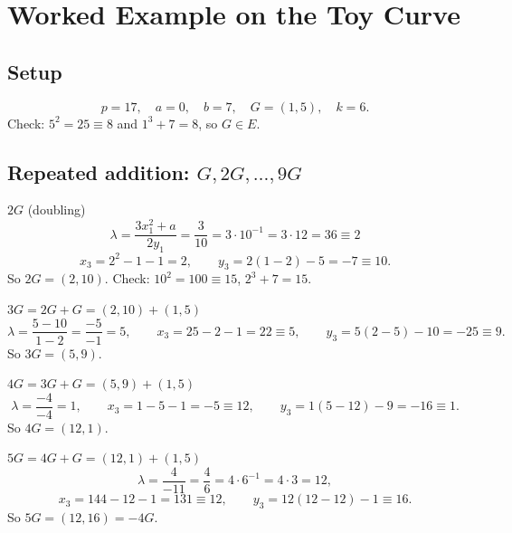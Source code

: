 \chapter{Worked Example on the Toy Curve}
\label{ch:worked}


\section{Setup}

\[
  p = 17, \quad a = 0, \quad b = 7, \quad G = (1, 5), \quad k = 6 .
\]
Check: $5^2 = 25 \equiv 8$ and $1^3 + 7 = 8$, so $G \in E$. \checkmark

\section{Repeated addition: $G, 2G, \ldots, 9G$}

\begin{framedex}[label={ex:2G}]{$2G$ (doubling)}
  \[
    \lambda = \frac{3 x_1^2 + a}{2 y_1} = \frac{3}{10} = 3 \cdot 10^{-1} = 3 \cdot 12 = 36 \equiv 2
  \]
  \[
    x_3 = 2^2 - 1 - 1 = 2, \qquad y_3 = 2(1 - 2) - 5 = -7 \equiv 10 .
  \]
  So $2G = (2, 10)$. Check: $10^2 = 100 \equiv 15$, $2^3 + 7 = 15$. \checkmark
\end{framedex}

\begin{framedex}{$3G = 2G + G = (2,10) + (1,5)$}
  \[
    \lambda = \frac{5 - 10}{1 - 2} = \frac{-5}{-1} = 5, \qquad
    x_3 = 25 - 2 - 1 = 22 \equiv 5, \qquad
    y_3 = 5(2 - 5) - 10 = -25 \equiv 9 .
  \]
  So $3G = (5, 9)$.
\end{framedex}

\begin{framedex}{$4G = 3G + G = (5,9) + (1,5)$}
  \[
    \lambda = \frac{-4}{-4} = 1, \qquad
    x_3 = 1 - 5 - 1 = -5 \equiv 12, \qquad
    y_3 = 1(5 - 12) - 9 = -16 \equiv 1 .
  \]
  So $4G = (12, 1)$.
\end{framedex}

\begin{framedex}{$5G = 4G + G = (12,1) + (1,5)$}
  \[
    \lambda = \frac{4}{-11} = \frac{4}{6} = 4 \cdot 6^{-1} = 4 \cdot 3 = 12,
  \]
  \[
    x_3 = 144 - 12 - 1 = 131 \equiv 12, \qquad
    y_3 = 12(12 - 12) - 1 \equiv 16 .
  \]
  So $5G = (12, 16) = -4G$.
\end{framedex}

